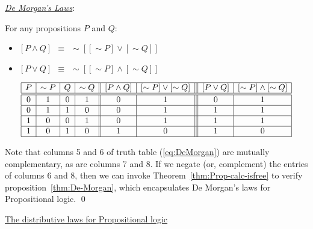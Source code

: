 \bigskip

\noindent 
\underline{\it De Morgan's Laws}:

\begin{prop}
\label{thm:De-Morgan}
For any propositions $P$ and $Q$:
\begin{itemize}
\item
$[ P \wedge Q ] \ \ \equiv \ \ \sim [ [\sim P] \vee [\sim Q]]$
\item
$[ P \vee Q ] \ \ \equiv \ \ \sim [ [\sim P] \wedge [\sim Q]]$
\end{itemize}
\end{prop}

\begin{equation}
\label{eq:DeMorgan}
\begin{array}{|c|c|c|c||c|c|||c|c|}
\hline
P & \sim P & Q & \sim Q 
  & [ P \wedge Q ]
  & [\sim P] \vee [\sim Q]
  & [ P \vee Q ]
  & [\sim P] \wedge [\sim Q] \\
\hline
\hline
0 & 1 & 0 & 1
  & 0
  & 1
  & 0
  & 1 \\
\hline
0 & 1 & 1 & 0
  & 0
  & 1
  & 1
  & 1 \\
\hline
1 & 0 & 0 & 1
  & 0
  & 1
  & 1
  & 1 \\
\hline
1 & 0 & 1 & 0
  & 1
  & 0
  & 1
  & 0 \\
\hline
\end{array}
\end{equation}

Note that columns 5 and 6 of truth table (\ref{eq:DeMorgan}) are
mutually complementary, as are columns 7 and 8.  If we negate (or,
complement) the entries of columns 6 and 8, then we can invoke
Theorem~\ref{thm:Prop-calc-isfree} to verify
proposition~\ref{thm:De-Morgan}, which encapsulates De Morgan's laws
for Propositional logic.  \qed

\medskip

\noindent 
\underline{\small\sf The distributive laws for Propositional
  logic}


